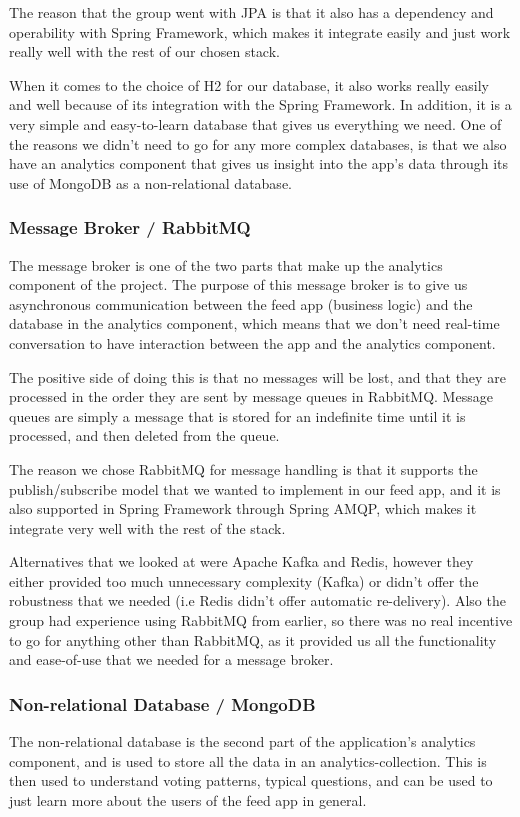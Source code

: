 The reason that the group went with JPA is that it also has a dependency and operability with Spring Framework, which makes it integrate easily and just work really well with the rest of our chosen stack.

When it comes to the choice of H2 for our database, it also works really easily and well because of its integration with the Spring Framework. In addition, it is a very simple and easy-to-learn database that gives us everything we need. One of the reasons we didn't need to go for any more complex databases, is that we also have an analytics component that gives us insight into the app’s data through its use of MongoDB as a non-relational database.

\subsubsection{Message Broker / RabbitMQ}
The message broker is one of the two parts that make up the analytics component of the project. The purpose of this message broker is to give us asynchronous communication between the feed app (business logic) and the database in the analytics component, which means that we don’t need real-time conversation to have interaction between the app and the analytics component. 

The positive side of doing this is that no messages will be lost, and that they are processed in the order they are sent by message queues in RabbitMQ. Message queues are simply a message that is stored for an indefinite time until it is processed, and then deleted from the queue.

The reason we chose RabbitMQ for message handling is that it supports the publish/subscribe model that we wanted to implement in our feed app, and it is also supported in Spring Framework through Spring AMQP, which makes it integrate very well with the rest of the stack.

Alternatives that we looked at were Apache Kafka and Redis, however they either provided too much unnecessary complexity (Kafka) or didn't offer the robustness that we needed (i.e Redis didn’t offer automatic re-delivery). Also the group had experience using RabbitMQ from earlier, so there was no real incentive to go for anything other than RabbitMQ, as it provided us all the functionality and ease-of-use that we needed for a message broker.

\subsubsection{Non-relational Database / MongoDB}
The non-relational database is the second part of the application’s analytics component, and is used to store all the data in an analytics-collection. This is then used to understand voting patterns, typical questions, and can be used to just learn more about the users of the feed app in general.

